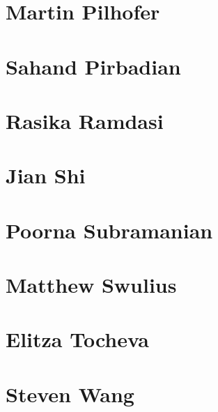 \documentclass[]{tufte-book}
\begin{document}
\hypertarget{martin_pilhofer}{%
\section*{Martin Pilhofer}\label{martin_pilhofer}}

\hypertarget{sahand_pirbadian}{%
\section*{Sahand Pirbadian}\label{sahand_pirbadian}}

\hypertarget{rasika_ramdasi}{%
\section*{Rasika Ramdasi}\label{rasika_ramdasi}}

\hypertarget{jian_shi}{%
\section*{Jian Shi}\label{jian_shi}}

\hypertarget{poorna_subramanian}{%
\section*{Poorna Subramanian}\label{poorna_subramanian}}

\hypertarget{matthew_swulius}{%
\section*{Matthew Swulius}\label{matthew_swulius}}

\hypertarget{elitza_tocheva}{%
\section*{Elitza Tocheva}\label{elitza_tocheva}}

\hypertarget{steven_wang}{%
\section*{Steven Wang}\label{steven_wang}}
\end{document}
